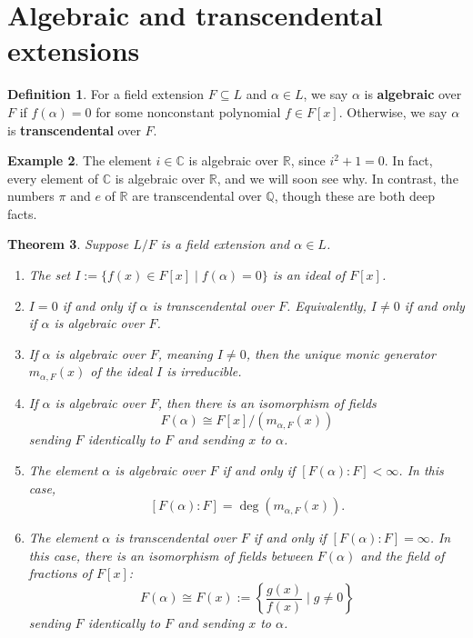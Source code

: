 \documentclass[12pt]{report}
\newtheorem{theorem}{Theorem}[chapter]
\numberwithin{equation}{section}
\numberwithin{theorem}{chapter}
\theoremstyle{definition}
\newtheorem{definition}[theorem]{Definition}
\newtheorem{example}[theorem]{Example}
\newtheorem*{basic properties}{Basic Properties}
\newtheorem*{Important Remark}{Important Remark}
\newcommand{\df}[1]{{\bf #1}\index{#1}}
\newcommand{\C}{\mathbb{C}}
\begin{document}
\section{Algebraic and transcendental extensions}

\begin{definition}
For a field extension $F \subseteq L$ and $\alpha \in L$, we say $\alpha$ is \df{algebraic} over $F$ if $f(\alpha) = 0$ for some nonconstant polynomial $f \in F[x]$. Otherwise, we say $\alpha$ is \df{transcendental} over $F$.
\end{definition}

\begin{example}
The element $i \in \C$ is algebraic over $\mathbb{R}$, since $i^2+1=0$. In fact, every element of $\C$ is algebraic over $\mathbb{R}$, and we will soon see why. In contrast, the numbers $\pi$ and $e$ of $\mathbb{R}$ are transcendental over $\mathbb{Q}$, though these are both deep facts.
\end{example}




\begin{theorem}\label{thm algebraic vs transcendental elements}  
Suppose $L/F$ is a field extension and $\alpha \in L$.
\begin{enumerate}[label=(\arabic*)]
\item The set $I := \{f(x) \in F[x] \mid f(\alpha) = 0\}$ is an ideal of $F[x]$.
\item $I = 0$ if and only if $\alpha$ is transcendental over $F$. Equivalently, $I \neq 0$ if and only if $\alpha$ is algebraic over $F$.
\item If $\alpha$ is algebraic over $F$, meaning $I \neq 0$, then the unique monic generator $m_{\alpha, F}(x)$ of the ideal $I$ is irreducible.
\item If $\alpha$ is algebraic over $F$, then there is an isomorphism of fields
$$F(\alpha)  \cong  F[x]/(m_{\alpha, F}(x))$$
sending $F$ identically to $F$ and sending $x$ to $\alpha$.
\item The element $\alpha$ is algebraic over $F$ if and only if $[F(\alpha): F] < \infty$. In this case,
$$[F(\alpha): F] = \deg(m_{\alpha, F}(x)).$$
\item The element $\alpha$ is transcendental over $F$ if and only if $[F(\alpha): F] = \infty$. In this case, there is an isomorphism of fields between $F(\alpha)$ and the field of fractions of $F[x]$:
$$F(\alpha) \cong F(x) := \left\lbrace\frac{g(x)}{f(x)}\mid  g \neq 0 \right\rbrace$$
sending $F$ identically to $F$ and sending $x$ to $\alpha$.
\end{enumerate}
\end{theorem}
\end{document}
